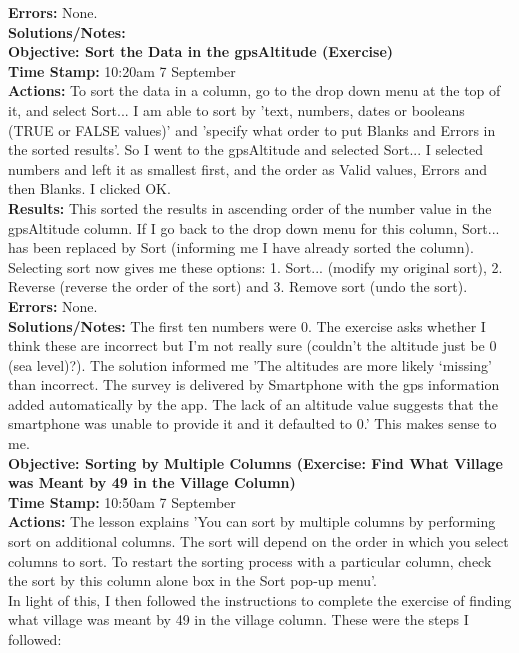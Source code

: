 \documentclass{article}
\begin{document}
\begin{FlushLeft}
\textbf{Errors:} None.\\
\textbf{Solutions/Notes:}\\
\vspace{5mm}
\textbf{Objective: Sort the Data in the gps\textunderscore Altitude (Exercise)}\\ 
\textbf{Time Stamp:} 10:20am 7 September\\
\textbf{Actions:} To sort the data in a column, go to the drop down menu at the top of it, and select Sort... I am able to sort by 'text, numbers, dates or booleans (TRUE or FALSE values)' and 'specify what order to put Blanks and Errors in the sorted results'. So I went to the gps\textunderscore Altitude and selected Sort... I selected numbers and left it as smallest first, and the order as Valid values, Errors and then Blanks. I clicked OK.\\
\textbf{Results:} This sorted the results in ascending order of the number value in the gps\textunderscore Altitude column. If I go back to the drop down menu for this column, Sort... has been replaced by Sort (informing me I have already sorted the column). Selecting sort now gives me these options: 1. Sort... (modify my original sort), 2. Reverse (reverse the order of the sort) and 3. Remove sort (undo the sort).\\
\textbf{Errors:} None.\\
\textbf{Solutions/Notes:} The first ten numbers were 0. The exercise asks whether I think these are incorrect but I'm not really sure (couldn't the altitude just be 0 (sea level)?). The solution informed me 'The altitudes are more likely ‘missing’ than incorrect. The survey is delivered by Smartphone with the gps information added automatically by the app. The lack of an altitude value suggests that the smartphone was unable to provide it and it defaulted to 0.' This makes sense to me.\\
\vspace{5mm}
\textbf{Objective: Sorting by Multiple Columns (Exercise: Find What Village was Meant by 49 in the Village Column)}\\ 
\textbf{Time Stamp:} 10:50am 7 September\\
\textbf{Actions:} The lesson explains 'You can sort by multiple columns by performing sort on additional columns. The sort will depend on the order in which you select columns to sort. To restart the sorting process with a particular column, check the sort by this column alone box in the Sort pop-up menu'.\\
In light of this, I then followed the instructions to complete the exercise of finding what village was meant by 49 in the village column. These were the steps I followed:

\end{FlushLeft}
\end{document}
